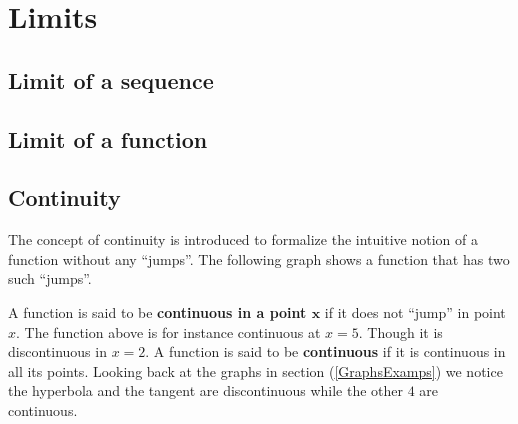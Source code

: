 \chapter{Limits}
\label{Limits_Chapter}

\section{Limit of a sequence}

\section{Limit of a function}

\section{Continuity}

\noindent The concept of continuity is introduced to formalize the intuitive notion of a function without any "`jumps"'. The following graph shows a function that has two such "`jumps"'. 
\begin{center}
\end{center}
\noindent A function is said to be \textbf{continuous in a point $\mathbf{x}$} if it does not "`jump"' in point $x$. The function above is for instance continuous at $x= 5$. Though it is discontinuous in $x=2$. A function is said to be \textbf{continuous} if it is continuous in all its points. Looking back at the graphs in section (\ref{GraphsExamps}) we notice the hyperbola and the tangent are discontinuous while the other $4$ are continuous.\\

